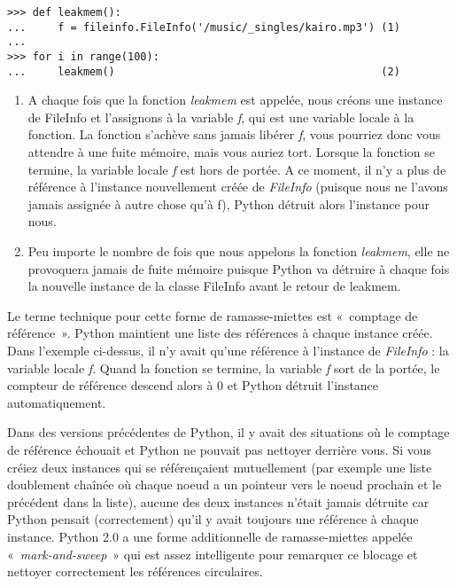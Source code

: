 \begin{example}
\begin{lstlisting}
>>> def leakmem():
...     f = fileinfo.FileInfo('/music/_singles/kairo.mp3') (1)
...
>>> for i in range(100):
...     leakmem()                                          (2)
\end{lstlisting}
\end{example}

\begin{enumerate}
\item{A chaque fois que la fonction \emph{leakmem} est appelée, nous créons une instance de FileInfo et l'assignons à la variable \emph{f}, qui est une variable locale à la fonction. La fonction s'achève sans jamais libérer \emph{f}, vous pourriez donc vous attendre à une fuite mémoire, mais vous auriez tort. Lorsque la fonction se termine, la variable locale \emph{f} est hors de portée. A ce moment, il n'y a plus de référence à l'instance nouvellement créée de \emph{FileInfo} (puisque nous ne l'avons jamais assignée à autre chose qu'à f), Python détruit alors l'instance pour nous.}
\item{Peu importe le nombre de fois que nous appelons la fonction \emph{leakmem}, elle ne provoquera jamais de fuite mémoire puisque Python va détruire à chaque fois la nouvelle instance de la classe FileInfo avant le retour de leakmem.}
\end{enumerate}

Le terme technique pour cette forme de ramasse-miettes est «~comptage de référence~». Python maintient une liste des références à chaque instance créée. Dans l'exemple ci-dessus, il n'y avait qu'une référence à l'instance de \emph{FileInfo} : la variable locale \emph{f}. Quand la fonction se termine, la variable \emph{f} sort de la portée, le compteur de référence descend alors à 0 et Python détruit l'instance automatiquement.

Dans des versions précédentes de Python, il y avait des situations où le comptage de référence échouait et Python ne pouvait pas nettoyer derrière vous. Si vous créiez deux instances qui se référençaient mutuellement (par exemple une liste doublement chaînée où chaque noeud a un pointeur vers le noeud prochain et le précédent dans la liste), aucune des deux instances n'était jamais détruite car Python pensait (correctement) qu'il y avait toujours une référence à chaque instance. Python 2.0 a une forme additionnelle de ramasse-miettes appelée «~\emph{mark-and-sweep}~» qui est assez intelligente pour remarquer ce blocage et nettoyer correctement les références circulaires.

